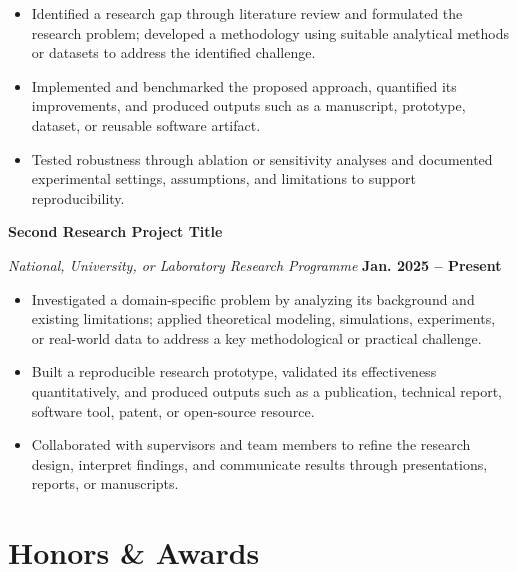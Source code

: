 \documentclass[11pt,a4paper]{article}
\newcommand{\daterange}[1]{{\textbf{#1}}}
\newcommand{\entrytitle}[1]{{\textbf{#1}}}
\begin{document}
\begin{itemize}[label={\textbullet}, labelindent=0pt, leftmargin=*, labelsep=0.45em,
                topsep=0.15em, itemsep=0pt, parsep=0pt]
    \item Identified a research gap through literature review and formulated the research problem; developed a methodology using suitable analytical methods or datasets to address the identified challenge.
    \item Implemented and benchmarked the proposed approach, quantified its improvements, and produced outputs such as a manuscript, prototype, dataset, or reusable software artifact.
    \item Tested robustness through ablation or sensitivity analyses and documented experimental settings, assumptions, and limitations to support reproducibility.
\end{itemize}

\noindent
\entrytitle{Second Research Project Title}

\par\noindent
\textit{National, University, or Laboratory Research Programme}
\hfill \daterange{Jan. 2025 -- Present}

\begin{itemize}[label={\textbullet}, labelindent=0pt, leftmargin=*, labelsep=0.45em,
                topsep=0.15em, itemsep=0pt, parsep=0pt]
    \item Investigated a domain-specific problem by analyzing its background and existing limitations; applied theoretical modeling, simulations, experiments, or real-world data to address a key methodological or practical challenge.
    \item Built a reproducible research prototype, validated its effectiveness quantitatively, and produced outputs such as a publication, technical report, software tool, patent, or open-source resource.
    \item Collaborated with supervisors and team members to refine the research design, interpret findings, and communicate results through presentations, reports, or manuscripts.
\end{itemize}

\section*{Honors \& Awards}
\vspace{-0.1em}
\end{document}
